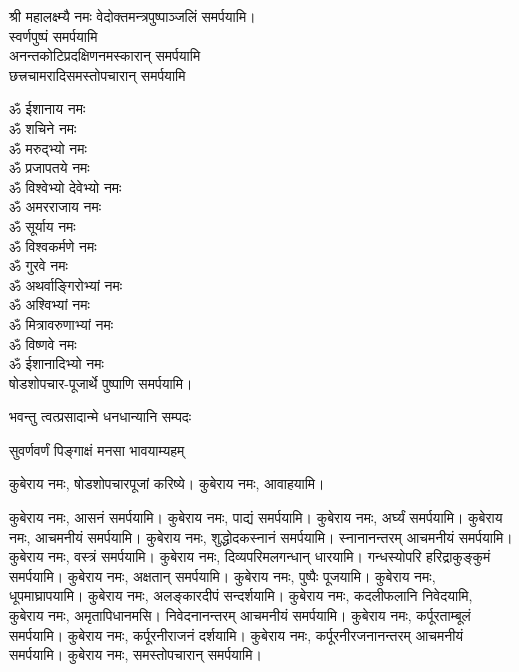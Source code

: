 \begin{center}
श्री महालक्ष्म्यै नमः वेदोक्तमन्त्रपुष्पाञ्जलिं समर्पयामि।\\

स्वर्णपुष्पं समर्पयामि\\
 
अनन्तकोटिप्रदक्षिणनमस्कारान् समर्पयामि\\

छत्त्रचामरादिसमस्तोपचारान् समर्पयामि\\

\end{center}


ॐ ईशानाय नमः\\
ॐ शचिने नमः\\
ॐ मरुद्भ्यो नमः\\
ॐ प्रजापतये नमः\\
ॐ विश्वेभ्यो देवेभ्यो नमः\\
ॐ अमरराजाय नमः\\
ॐ सूर्याय नमः\\
ॐ विश्वकर्मणे नमः\\
ॐ गुरवे नमः\\
ॐ अथर्वाङ्गिरोभ्यां नमः\\
ॐ अश्विभ्यां नमः\\
ॐ मित्रावरुणाभ्यां नमः\\
ॐ विष्णवे नमः\\
ॐ ईशानादिभ्यो नमः\\

षोडशोपचार-पूजार्थे पुष्पाणि समर्पयामि।




{भवन्तु त्वत्प्रसादान्मे धनधान्यानि सम्पदः}

{सुवर्णवर्णं पिङ्गाक्षं मनसा भावयाम्यहम्}


कुबेराय नमः, षोडशोपचारपूजां करिष्ये।
कुबेराय नमः, आवाहयामि।


कुबेराय नमः, आसनं समर्पयामि।
कुबेराय नमः, पाद्यं समर्पयामि।
कुबेराय नमः, अर्घ्यं समर्पयामि।
कुबेराय नमः, आचमनीयं समर्पयामि।
कुबेराय नमः, शुद्धोदकस्नानं समर्पयामि। स्नानानन्तरम् आचमनीयं समर्पयामि।
कुबेराय नमः, वस्त्रं समर्पयामि।
कुबेराय नमः, दिव्यपरिमलगन्धान् धारयामि। गन्धस्योपरि हरिद्राकुङ्कुमं समर्पयामि।
कुबेराय नमः, अक्षतान् समर्पयामि।
कुबेराय नमः, पुष्पैः पूजयामि।
कुबेराय नमः, धूपमाघ्रापयामि।
कुबेराय नमः, अलङ्कारदीपं सन्दर्शयामि।
कुबेराय नमः, कदलीफलानि निवेदयामि, \\
कुबेराय नमः, अमृतापिधानमसि। निवेदनानन्तरम् आचमनीयं समर्पयामि।
कुबेराय नमः, कर्पूरताम्बूलं समर्पयामि।
कुबेराय नमः, कर्पूरनीराजनं दर्शयामि।
कुबेराय नमः, कर्पूरनीरजनानन्तरम् आचमनीयं समर्पयामि।
कुबेराय नमः, समस्तोपचारान् समर्पयामि।



